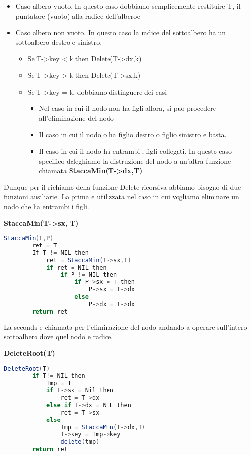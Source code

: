 \begin{itemize}
	\item Caso albero vuoto. In questo caso dobbiamo semplicemente restituire T, il puntatore (vuoto) alla radice dell'alberoe
	\item Caso albero non vuoto. In questo caso la radice del sottoalbero ha un sottoalbero destro e sinistro.
		\begin{itemize}
			\item Se T->key < k then Delete(T->dx,k)
			\item Se T->key > k then Delete(T->sx,k)
			\item Se T->key = k, dobbiamo distinguere dei casi
			\begin{itemize}
				\item Nel caso in cui il nodo non ha figli allora, si puo procedere all'eliminazione del nodo
				\item Il caso in cui il nodo o ha figlio destro o figlio sinistro e basta.
				\item Il caso in cui il nodo ha entrambi i figli collegati. In questo caso specifico deleghiamo la distruzione del nodo a un'altra funzione chiamata \textbf{StaccaMin(T->dx,T)}.
			\end{itemize}
		\end{itemize}
\end{itemize}

Dunque per il richiamo della funzione Delete ricorsiva abbiamo bisogno di due funzioni ausiliarie. La prima e utilizzata nel caso in cui vogliamo eliminare un nodo che ha entrambi i figli.

\textbf{StaccaMin(T->sx, T)}

\begin{lstlisting}[language=Java]
	StaccaMin(T,P)
		ret = T
		If T != NIL then
			ret = StaccaMin(T->sx,T)
			if ret = NIL then
				if P != NIL then
					if P->sx = T then
						P->sx = T->dx
					else
						P->dx = T->dx
		return ret
\end{lstlisting}

La seconda e chiamata per l'eliminazione del nodo andando a operare sull'intero sottoalbero dove quel nodo e radice.

\textbf{DeleteRoot(T)}

\begin{lstlisting}[language=Java]
	DeleteRoot(T)
		if T!= NIL then
			Tmp = T
			if T->sx = Nil then
				ret = T->dx
			else if T->dx = NIL then
				ret = T->sx
			else
				Tmp = StaccaMin(T->dx,T)
				T->key = Tmp->key
				delete(tmp)
		return ret
\end{lstlisting}

